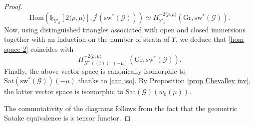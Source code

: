 \documentclass[11pt]{amsart}
\theoremstyle{plain}
\theoremstyle{remark}
\numberwithin{equation}{section}
\begin{document}
\begin{proof}
		$$\mathrm{Hom}(\underline{\mathbb{k}}_{Y'_\beta}[2\langle\rho,\mu\rangle],j^!(\mathrm{sw}^*(\mathcal{G})))\simeq H_{Y'_\beta}^{-2\langle\rho,\mu\rangle}(\mathrm{Gr},\mathrm{sw}^*(\mathcal{G})). $$
		Now, using distinguished triangles associated with open and closed immersions together with an induction on the number of strata of $Y$, we deduce that \eqref{hom space 2} coincides with
		$$H_{N^{-}((t))\cdot(-\mu)}^{-2\langle\rho,\mu\rangle}(\mathrm{Gr},\mathrm{sw}^*(\mathcal{G})). $$
		Finally, the above vector space is canonically isomorphic to $\mathrm{Sat}(\mathrm{sw}^*(\mathcal{G}))(-\mu)$ thanks to \eqref{can iso}. By Proposition \ref{prop Chevalley inv}, the latter vector space is isomorphic to $\mathrm{Sat}(\mathcal{G})(w_0(\mu))$.

  The commutativity of the diagrams follows from the fact that the geometric Satake equivalence is a tensor functor.
	\end{proof}
\end{document}
